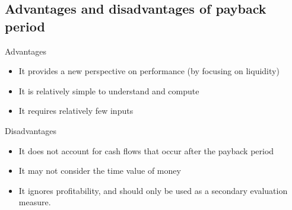 \documentclass[class=report, crop=false, 12pt,a4paper]{standalone}
\begin{document}
\subsection{Advantages and disadvantages of payback period}
Advantages
\begin{itemize}
	\item It provides a new perspective on performance (by focusing on liquidity)
	\item It is relatively simple to understand and compute
	\item It requires relatively few inputs
\end{itemize}
Disadvantages
\begin{itemize}
	\item It does not account for cash flows that occur after the payback period
	\item It may not consider the time value of money
	\item It ignores profitability, and should only be used as a secondary evaluation measure.
\end{itemize}
\end{document}
